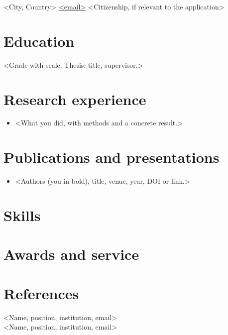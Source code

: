 \documentclass[10pt]{article}
\begin{document}
  {<City, Country> \enspace\textbullet\enspace \href{mailto:<email>}{<email>} \enspace\textbullet{}}
  {<Citizenship, if relevant to the application>}

\section{Education}
<Grade with scale. Thesis: title, supervisor.>

\section{Research experience}
\begin{itemize}
  \item <What you did, with methods and a concrete result.>
\end{itemize}

\section{Publications and presentations}
\begin{itemize}
  \item <Authors (you in bold), title, venue, year, DOI or link.>
\end{itemize}

\section{Skills}

\section{Awards and service}

\section{References}
<Name, position, institution, email> \\
<Name, position, institution, email>
\end{document}
